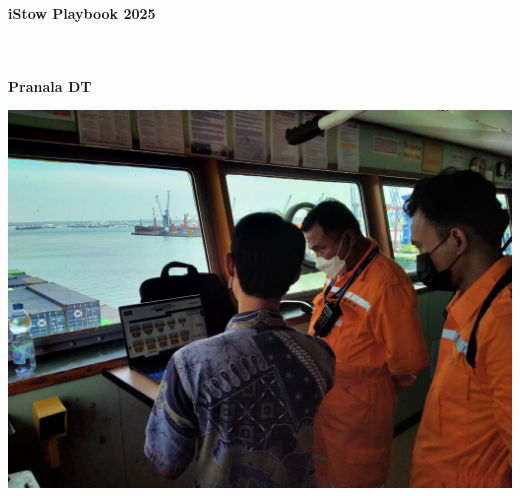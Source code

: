 
\thispagestyle{empty}

\vspace{3cm}
  \begin{center}
	\bfseries \Huge \latex iStow Playbook 2025 \par   %
        ~\\
        ~\\
        \bfseries \Large Pranala DT \par   %

        \vspace{3cm}
    
      	{\centering \includegraphics[width=0.6\linewidth]{images/IMG20220130101652-1024x768.jpg}}
    \end{center}
    
\par

\newpage
